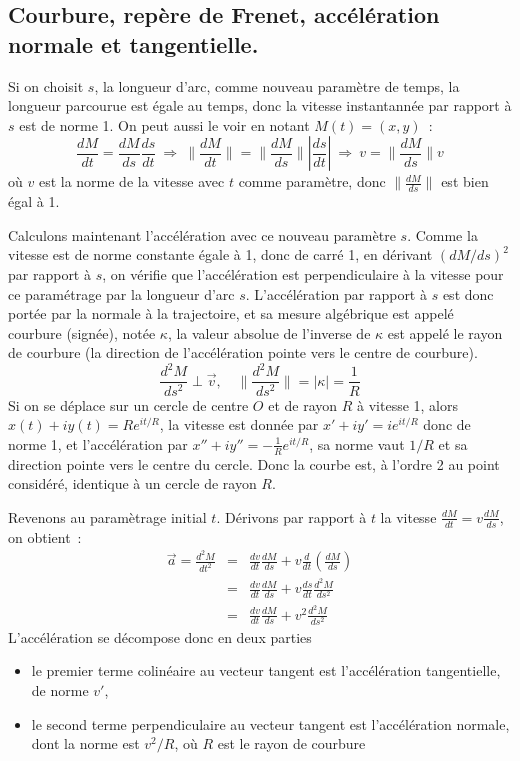 \documentclass[a4paper,11pt]{book}
\begin{document}
\begin{giacjshere}
\section{Courbure, rep\`ere de Frenet, accélération normale et
  tangentielle.} \label{sec:courbure}
Si on choisit $s$, la longueur d'arc, comme nouveau paramètre de temps, 
la longueur parcourue est égale au temps, donc la vitesse instantannée
par rapport \`a $s$ est de norme 1. On peut aussi le voir en notant $M(t)=(x,y)$~:
$$ \frac{dM}{dt} =\frac{dM}{ds} \frac{ds}{dt} 
\ \Rightarrow \ \| \frac{dM}{dt} \| = \| \frac{dM}{ds} \| |\frac{ds}{dt}|
\ \Rightarrow \ v = \| \frac{dM}{ds} \| v$$
o\`u $v$ est la norme de la vitesse avec $t$ comme param\`etre,
donc $\| \frac{dM}{ds} \|$ est bien \'egal \`a 1.

Calculons maintenant l'accélération avec ce nouveau paramètre $s$. Comme
la vitesse est de norme constante égale à 1, donc de carré 1, 
en dérivant $(dM/ds)^2$ par rapport \`a $s$,
on v\'erifie que l'accélération est perpendiculaire à la vitesse
pour ce paramétrage par la longueur d'arc $s$. 
L'acc\'el\'eration par rapport \`a $s$ est donc portée par la normale à la trajectoire,
et sa mesure alg\'ebrique est appelé courbure (sign\'ee), not\'ee $\kappa$,
la valeur absolue de l'inverse de $\kappa$ est appel\'e le rayon de courbure
(la direction de l'accélération pointe vers le centre
de courbure). 
$$ \frac{d^2M}{ds^2} \perp \vec{v}, \quad \| \frac{d^2M}{ds^2}\| =
|\kappa| = \frac{1}{R} $$
Si on se déplace sur un cercle de centre $O$
et de rayon $R$ à vitesse 1, alors $x(t)+iy(t)=Re^{it/R}$, la vitesse
est donnée par $x'+iy'=ie^{it/R}$ donc de norme 1, et l'accélération
par $x''+iy''=-\frac1R e^{it/R}$, sa norme vaut $1/R$ et sa direction
pointe vers le centre du cercle. Donc la courbe est, 
à l'ordre 2 au point considéré, identique à un cercle de rayon $R$.

Revenons au paramètrage initial $t$. Dérivons par rapport à $t$ la vitesse
$\frac{dM}{dt} = v \frac{dM}{ds}$, on obtient~:
\begin{eqnarray*}
 \vec{a} =\frac{d^2M}{dt^2} 
&=&\frac{dv}{dt} \frac{dM}{ds} + v \frac{d}{dt} \left( \frac{dM}{ds} \right)\\
&=&\frac{dv}{dt} \frac{dM}{ds} + v \frac{ds}{dt} \frac{d^2M}{ds^2}\\
&=& \frac{dv}{dt} \frac{dM}{ds} + v^2 \frac{d^2M}{ds^2}
\end{eqnarray*}
L'accélération se décompose donc en deux parties~
\begin{itemize}
\item  le premier
terme colinéaire au vecteur tangent est l'accélération 
tangentielle, 
de norme $v'$, 
\item le second terme perpendiculaire au vecteur tangent
est l'accélération normale, 
dont la norme est $v^2/R$,
où $R$ est le rayon de courbure
\end{itemize}


\end{giacjshere}
\end{document}
